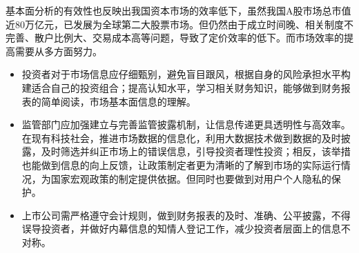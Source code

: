 基本面分析的有效性也反映出我国资本市场的效率低下，虽然我国A股市场总市值近80万亿元，已发展为全球第二大股票市场。但仍然由于成立时间晚、相关制度不完善、散户比例大、交易成本高等问题，导致了定价效率的低下\cite{wangJiBenMianFenXiZaiZhongGuoAGuShiChangYouYongMaLaiZiJiDuCaiWuBaoBiaoDeZhengJu2018}。而市场效率的提高需要从多方面努力。
\begin{itemize}
\item 投资者对于市场信息应仔细甄别，避免盲目跟风，根据自身的风险承担水平构建适合自己的投资组合；提高认知水平，学习相关财务知识，能够做到财务报表的简单阅读，市场基本面信息的理解。

\item 监管部门应加强建立与完善监管披露机制，让信息传递更具透明性与高效率。在现有科技社会，推进市场数据的信息化，利用大数据技术做到数据的及时披露，及时筛选并纠正市场上的错误信息，引导投资者理性投资；相反，该举措也能做到信息的向上反馈，让政策制定者更为清晰的了解到市场的实际运行情况，为国家宏观政策的制定提供依据。但同时也要做到对用户个人隐私的保护。

\item 上市公司需严格遵守会计规则，做到财务报表的及时、准确、公平披露，不得误导投资者，并做好内幕信息的知情人登记工作，减少投资者层面上的信息不对称。


\end{itemize}


